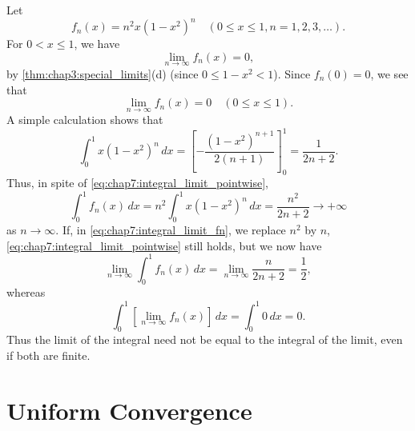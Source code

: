 \begin{example} %
  \label{ex:chap7:integral_limit_swap}
  Let
  \begin{equation} \label{eq:chap7:integral_limit_fn}
    f_n(x) = n^2 x (1-x^2)^n \quad (0 \le x \le 1, n=1, 2, 3, \dots).
  \end{equation}
  For $0 < x \le 1$, we have
  \[ \lim_{n \to \infty} f_n(x) = 0, \]
  by \autoref{thm:chap3:special_limits}(d) (since $0 \le 1-x^2 < 1$).
  Since $f_n(0)=0$, we see that
  \begin{equation} \label{eq:chap7:integral_limit_pointwise}
    \lim_{n \to \infty} f_n(x) = 0 \quad (0 \le x \le 1).
  \end{equation}
  A simple calculation shows that
  \[ \int_0^1 x(1-x^2)^n \, dx = \left[ -\frac{(1-x^2)^{n+1}}{2(n+1)}
  \right]_0^1 = \frac{1}{2n+2}. \]
  Thus, in spite of \eqref{eq:chap7:integral_limit_pointwise},
  \[ \int_0^1 f_n(x) \, dx = n^2 \int_0^1 x(1-x^2)^n \, dx =
  \frac{n^2}{2n+2} \to +\infty \]
  as $n \to \infty$.
  If, in \eqref{eq:chap7:integral_limit_fn}, we replace $n^2$ by $n$,
  \eqref{eq:chap7:integral_limit_pointwise} still holds, but we now have
  \[ \lim_{n \to \infty} \int_0^1 f_n(x) \, dx = \lim_{n \to \infty}
  \frac{n}{2n+2} = \frac{1}{2}, \]
  whereas
  \[ \int_0^1 \left[ \lim_{n \to \infty} f_n(x) \right] \, dx =
  \int_0^1 0 \, dx = 0. \]
  Thus the limit of the integral need not be equal to the integral of
  the limit, even if both are finite.
\end{example}



\section{Uniform Convergence}
\label{sec:chap7:uniform_convergence}


